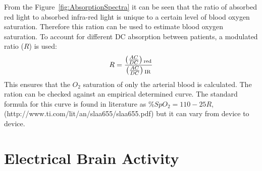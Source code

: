 From the Figure~\ref{fig:AbsorptionSpectra} it can be seen that the ratio of absorbed red light to absorbed infra-red light is unique to a certain level of blood oxygen saturation. Therefore this ration can be used to estimate blood oxygen saturation. To account for different DC absorption between patients, a modulated ratio ($R$) is used:
$$R = \frac{\left(\frac{AC}{DC}\right)\textsubscript{red}}{\left(\frac{AC}{DC}\right)\textsubscript{IR}} $$
This ensures that the $ O_2 $ saturation of only the arterial blood is calculated. The ration can be checked against an empirical determined curve. The standard formula for this curve is found in literature as $ \% SpO_2 = 110-25R $, (http://www.ti.com/lit/an/slaa655/slaa655.pdf) but it can vary from device to device. 


\section{Electrical Brain Activity}
